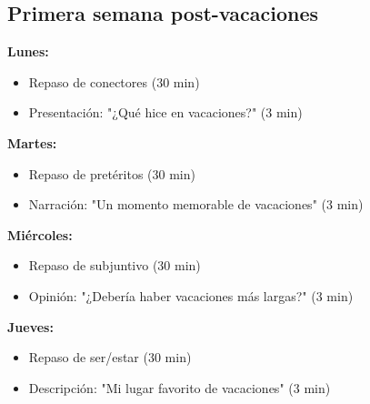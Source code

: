 \documentclass[a4paper,11pt]{article}
\begin{document}
\vspace{0.2cm}

\subsection{Primera semana post-vacaciones}

\vspace{0.2cm}

\textbf{Lunes:}

\begin{itemize}

  \item Repaso de conectores (30 min)

  \item Presentación: "¿Qué hice en vacaciones?" (3 min)

\end{itemize}

\vspace{0.2cm}

\textbf{Martes:}

\begin{itemize}

  \item Repaso de pretéritos (30 min)

  \item Narración: "Un momento memorable de vacaciones" (3 min)

\end{itemize}

\vspace{0.2cm}

\textbf{Miércoles:}

\begin{itemize}

  \item Repaso de subjuntivo (30 min)

  \item Opinión: "¿Debería haber vacaciones más largas?" (3 min)

\end{itemize}

\vspace{0.2cm}

\textbf{Jueves:}

\begin{itemize}

  \item Repaso de ser/estar (30 min)

  \item Descripción: "Mi lugar favorito de vacaciones" (3 min)

\end{itemize}
\end{document}
